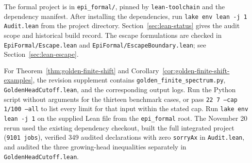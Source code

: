 \documentclass[11pt]{amsart}
\theoremstyle{definition}
\theoremstyle{remark}
\numberwithin{equation}{section}
\begin{document}
The formal project is in \texttt{epi\_formal/}, pinned by
\texttt{lean-toolchain} and the dependency manifest. After installing the
dependencies, run \texttt{lake env lean -j 1 Audit.lean} from the project
directory. Section~\ref{sec:lean-status} gives the audit scope and
historical build record. The escape formulations are checked in
\texttt{EpiFormal/\allowbreak Escape.lean} and
\texttt{EpiFormal/\allowbreak EscapeBoundary.lean}; see
Section~\ref{sec:lean-escape}.

For Theorem~\ref{thm:golden-finite-shift} and Corollary~\ref{cor:golden-finite-shift-examples}, the revision supplement contains
\texttt{golden\_\allowbreak{}finite\_\allowbreak{}spectrum.py},
\texttt{GoldenHeadCutoff.lean}, and the corresponding output logs.
Run the Python script without arguments for the thirteen benchmark cases,
or pass \texttt{22 7 --cap 1/100 --all} to list every limit for that input
within the stated cap. Run
\texttt{lake env lean -j 1} on the supplied Lean file from the
\texttt{epi\_formal} root. The November 20 rerun used the existing
dependency checkout, built the full integrated project (\texttt{9101 jobs}),
verified 349 audited declarations with zero \texttt{sorryAx} in
\texttt{Audit.lean}, and audited the three growing-head inequalities
separately in \texttt{GoldenHeadCutoff.lean}.
\end{document}
